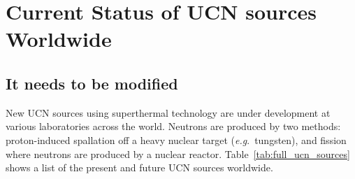 











\section{Current Status of UCN sources Worldwide}
\subsection {It needs to be modified}
New UCN sources using superthermal technology are under development at
various laboratories across the world.  Neutrons are produced by two
methods: proton-induced spallation off a heavy nuclear target
({\it{e.g}}.~tungsten), and fission where neutrons are produced by a nuclear
reactor. Table~\ref{tab:full_ucn_sources}~\cite{Jeff_dnp} shows a
list of the present and future UCN sources worldwide.



